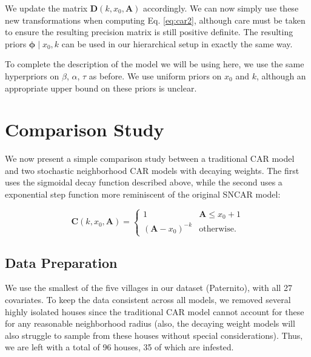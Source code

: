 \documentclass{scrartcl}
\newcommand{\todo}[1]{\textcolor{red}{TODO:
    #1}\PackageWarning{TODO:}{#1!}}
\newcommand{\mat}[1]{\bm{#1}}
\begin{document}
We update the matrix $\mat{D}(k, x_0, \mat{A})$ accordingly. We can
now simply use these new transformations when computing
Eq. \eqref{eq:car2}, although care must be taken to ensure the
resulting precision matrix is still positive definite. The resulting
priors $\mat{\phi} \mid x_0, k$ can be used in our hierarchical setup
in exactly the same way.

To complete the description of the model we will be using here, we use
the same hyperpriors on $\beta$, $\alpha$, $\tau$ as before. We use
uniform priors on $x_0$ and $k$, although an appropriate upper bound
on these priors is unclear. %



\section{Comparison Study}
\label{sec:simulation-study}

We now present a simple comparison study between a traditional CAR
model and two stochastic neighborhood CAR models with decaying
weights. The first uses the sigmoidal decay function described above,
while the second uses a exponential step function more reminiscent of
the original SNCAR model:

\begin{equation}
  \label{eq:decay-mat}
  \mat{C}(k, x_0, \mat{A}) =
  \begin{cases}
    1 & \mat{A} \leq x_0 + 1\\
    (\mat{A} - x_0)^{-k} & \text{otherwise.}
  \end{cases}
\end{equation}

\subsection{Data Preparation}
\label{sec:spatial-data}

We use the smallest of the five villages in our dataset (Paternito),
with all 27 covariates. 
To keep the data consistent across all models, we removed
several highly isolated houses since the traditional CAR model cannot
account for these for any reasonable neighborhood radius (also, the
decaying weight models will also struggle to sample from these houses
without special considerations). Thus, we are left with a total of 96
houses, 35 of which are infested.
\end{document}
